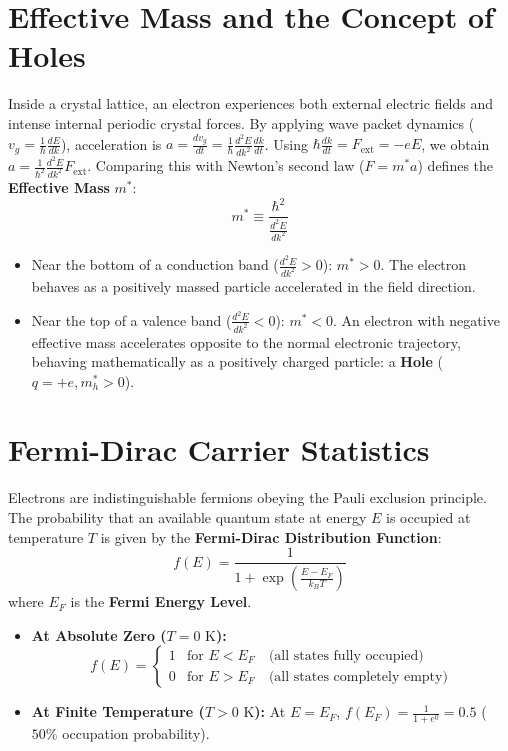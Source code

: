 \section{Effective Mass and the Concept of Holes}
Inside a crystal lattice, an electron experiences both external electric fields and intense internal periodic crystal forces. By applying wave packet dynamics ($v_g = \frac{1}{\hbar}\frac{dE}{dk}$), acceleration is $a = \frac{dv_g}{dt} = \frac{1}{\hbar}\frac{d^2E}{dk^2}\frac{dk}{dt}$.
Using $\hbar \frac{dk}{dt} = F_{\text{ext}} = -eE$, we obtain $a = \frac{1}{\hbar^2}\frac{d^2E}{dk^2} F_{\text{ext}}$.
Comparing this with Newton's second law ($F = m^* a$) defines the \textbf{Effective Mass} $m^*$:
\begin{equation}
m^* \equiv \frac{\hbar^2}{\frac{d^2 E}{dk^2}}
\end{equation}
\begin{itemize}[itemsep=2pt]
    \item Near the bottom of a conduction band ($\frac{d^2E}{dk^2} > 0$): $m^* > 0$. The electron behaves as a positively massed particle accelerated in the field direction.
    \item Near the top of a valence band ($\frac{d^2E}{dk^2} < 0$): $m^* < 0$. An electron with negative effective mass accelerates opposite to the normal electronic trajectory, behaving mathematically as a positively charged particle: a \textbf{Hole} ($q = +e, m_h^* > 0$).
\end{itemize}

\section{Fermi-Dirac Carrier Statistics}
Electrons are indistinguishable fermions obeying the Pauli exclusion principle. The probability that an available quantum state at energy $E$ is occupied at temperature $T$ is given by the \textbf{Fermi-Dirac Distribution Function}:
\begin{equation}
f(E) = \frac{1}{1 + \exp\left(\frac{E - E_F}{k_B T}\right)}
\end{equation}
where $E_F$ is the \textbf{Fermi Energy Level}.
\begin{itemize}[itemsep=2pt]
    \item \textbf{At Absolute Zero ($T = 0\text{ K}$):}
    \[
    f(E) = \begin{cases} 1 & \text{for } E < E_F \quad \text{(all states fully occupied)} \\ 0 & \text{for } E > E_F \quad \text{(all states completely empty)} \end{cases}
    \]
    \item \textbf{At Finite Temperature ($T > 0\text{ K}$):} At $E = E_F$, $f(E_F) = \frac{1}{1 + e^0} = 0.5$ ($50\%$ occupation probability).
\end{itemize}

